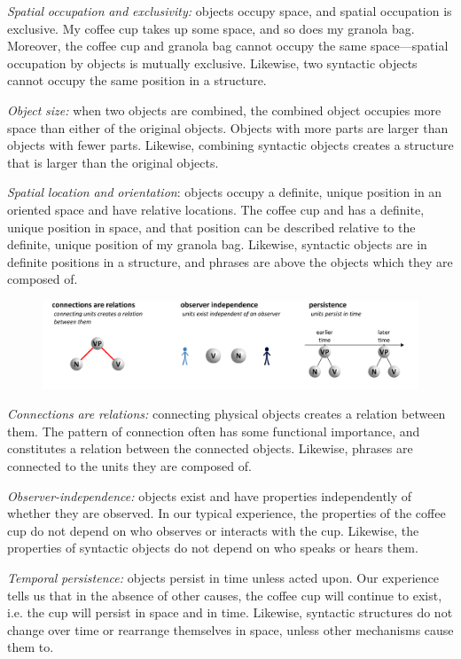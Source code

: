 \textit{Spatial} \textit{occupation} \textit{and} \textit{exclusivity:} objects occupy space, and spatial occupation is exclusive. My coffee cup takes up some space, and so does my granola bag. Moreover, the coffee cup and granola bag cannot occupy the same space—spatial occupation by objects is mutually exclusive. Likewise, two syntactic objects cannot occupy the same position in a structure. 

\textit{Object} \textit{size:} when two objects are combined, the combined object occupies more space than either of the original objects. Objects with more parts are larger than objects with fewer parts. Likewise, combining syntactic objects creates a structure that is larger than the original objects.

\textit{Spatial} \textit{location} \textit{and} \textit{orientation}: objects occupy a definite, unique position in an oriented space and have relative locations. The coffee cup and has a definite, unique position in space, and that position can be described relative to the definite, unique position of my granola bag. Likewise, syntactic objects are in definite positions in a structure, and phrases are above the objects which they are composed of.

  
\begin{figure}
\includegraphics[width=\textwidth]{figures/Tilsen-img31.png}
\caption{\missingcaption}
\label{fig:}
\end{figure}
 

\textit{Connections} \textit{are} \textit{relations:} connecting physical objects creates a relation between them. The pattern of connection often has some functional importance, and constitutes a relation between the connected objects. Likewise, phrases are connected to the units they are composed of.

\textit{Observer-independence:} objects exist and have properties independently of whether they are observed. In our typical experience, the properties of the coffee cup do not depend on who observes or interacts with the cup. Likewise, the properties of syntactic objects do not depend on who speaks or hears them.

\textit{Temporal} \textit{persistence:} objects persist in time unless acted upon. Our experience tells us that in the absence of other causes, the coffee cup will continue to exist, i.e. the cup will persist in space and in time. Likewise, syntactic structures do not change over time or rearrange themselves in space, unless other mechanisms cause them to.

